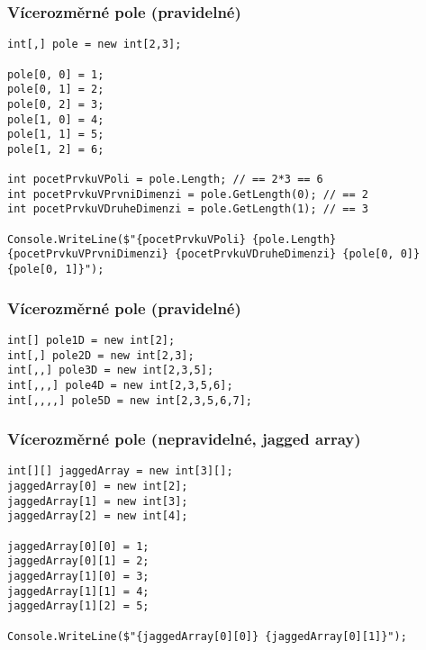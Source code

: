 \begin{frame}[fragile]
\frametitle{Vícerozměrné pole (pravidelné)}
\begin{yesblock}
\begin{lstlisting}
int[,] pole = new int[2,3];

pole[0, 0] = 1;
pole[0, 1] = 2;
pole[0, 2] = 3;
pole[1, 0] = 4;
pole[1, 1] = 5;
pole[1, 2] = 6;

int pocetPrvkuVPoli = pole.Length; // == 2*3 == 6
int pocetPrvkuVPrvniDimenzi = pole.GetLength(0); // == 2
int pocetPrvkuVDruheDimenzi = pole.GetLength(1); // == 3

Console.WriteLine($"{pocetPrvkuVPoli} {pole.Length} {pocetPrvkuVPrvniDimenzi} {pocetPrvkuVDruheDimenzi} {pole[0, 0]} {pole[0, 1]}");
\end{lstlisting}
\end{yesblock}
\end{frame}


\begin{frame}[fragile]
\frametitle{Vícerozměrné pole (pravidelné)}
\begin{yesblock}
\begin{lstlisting}
int[] pole1D = new int[2];
int[,] pole2D = new int[2,3];
int[,,] pole3D = new int[2,3,5];
int[,,,] pole4D = new int[2,3,5,6];
int[,,,,] pole5D = new int[2,3,5,6,7];
\end{lstlisting}
\end{yesblock}
\end{frame}



\begin{frame}[fragile]
\frametitle{Vícerozměrné pole (nepravidelné, jagged array)}
\begin{yesblock}
\begin{lstlisting}
int[][] jaggedArray = new int[3][];
jaggedArray[0] = new int[2];
jaggedArray[1] = new int[3];
jaggedArray[2] = new int[4];

jaggedArray[0][0] = 1;
jaggedArray[0][1] = 2;
jaggedArray[1][0] = 3;
jaggedArray[1][1] = 4;
jaggedArray[1][2] = 5;

Console.WriteLine($"{jaggedArray[0][0]} {jaggedArray[0][1]}");
\end{lstlisting}
\end{yesblock}
\end{frame}







